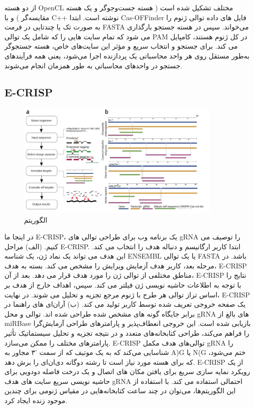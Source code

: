 \documentclass[12pt,a4paper,BCOR=.7cm,headsepline,bibliography=totoc]{report}
\begin{document}
 از دو هسته OpenCL مختلف تشکیل شده است
( هسته جست‌وجوگر و یک هسته مقایسه‌گر ) و با C++ نوشته است. ابتدا Cas-OFFinder فایل های داده توالی ژنوم را به صورت تک یا چندتایی در فرمت FASTA می‌خواند. سپس در هسته جستجو بارگذاری می شود که تمام سایت هایی را که شامل یک توالی PAM در کل ژنوم هستند، کامپایل می کند. برای جستجو و انتخاب سریع و مؤثر این سایت‌های خاص، هسته جستجوگر به‌طور مستقل روی هر واحد محاسباتی یک پردازنده اجرا می‌شود، یعنی همه فرآیندهای جستجو در واحدهای محاسباتی به طور همزمان انجام می‌شوند.


\subsection{E-CRISP ~\cite{E-CRISP}}
\begin{figure}
\centering
\includegraphics[width=10cm, ]{pictures/ecrispr.jpg}
\caption{
الگوریتم  \cite{E-CRISP}
}\label{wrap-fig:4}
\end{figure}

در اینجا ما E-CRISP، یک برنامه وب برای طراحی توالی های gRNA را توصیف می کنیم. (الف) مراحل E-CRISP. ابتدا کاربر ارگانیسم و دنباله هدف را انتخاب می کند. این هدف می تواند یک نماد ژن، یک شناسه ENSEMBL یا یک توالی FASTA باشد. در مرحله بعد، کاربر هدف آزمایش ویرایش را مشخص می کند. بسته به هدف، E-CRISP مناطق مختلفی از توالی ژن را مورد هدف قرار می دهد.
بعد از آن، E-CRISP نتایج را با توجه به اطلاعات حاشیه نویسی ژن فیلتر می کند. سپس، اهداف خارج از هدف بر اساس تراز توالی هر طرح با ژنوم مرجع تجزیه و تحلیل می شوند. در نهایت، E-CRISP یک صفحه خروجی تعریف شده توسط کاربر تولید می کند.
(ب) آر‌ان‌ای های راهنما در برابر جایگاه  گونه های مشخص شده طراحی شده اند. توالی و محل gRNA های بالغ از miRBase بازیابی شده است. این خروجی انعطاف‌پذیر و پارامترهای طراحی آزمایش‌گرا را فراهم می‌کند، طراحی کتابخانه‌های متعدد و در نتیجه تجزیه و تحلیل سیستماتیک تأثیر پارامترهای مختلف را ممکن می‌سازد. E-CRISP توالی‌های هدف مکمل gRNA را شناسایی می‌کند که به یک موتیف که از سمت  '۳ مجاور به A)G یا N(G ختم می‌شود، که برای هسته  مورد نیاز است تا رشته دوگانه دی‌ان‌ای را برش دهد. E-CRISP از یک رویکرد نمایه سازی سریع برای یافتن مکان های اتصال و یک درخت فاصله دودویی برای حاشیه نویسی سریع سایت های هدف gRNA احتمالی استفاده می کند. با استفاده از این الگوریتم‌ها، می‌توان در چند ساعت کتابخانه‌هایی در مقیاس ژنومی برای چندین موجود زنده ایجاد کرد.
\end{document}
